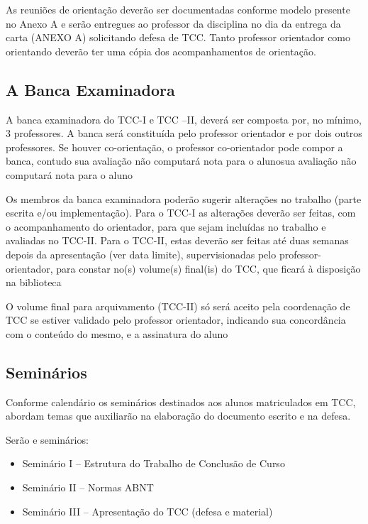 As reuniões de orientação deverão ser documentadas conforme modelo presente no Anexo A e serão entregues ao professor da disciplina no dia da entrega da carta (ANEXO A) solicitando defesa de TCC.
Tanto professor orientador como orientando deverão ter uma cópia dos acompanhamentos de orientação.
	

\subsection{A Banca Examinadora}

A banca examinadora do TCC-I e TCC –II, deverá ser composta por, no mínimo, 3 professores. A banca será constituída pelo 
professor orientador e por dois outros professores. Se houver co-orientação, o professor co-orientador pode compor a banca, contudo sua avaliação não computará nota para o alunosua avaliação não computará nota para o aluno 

Os membros da banca examinadora poderão sugerir alterações no trabalho (parte escrita e/ou implementação). Para o TCC-I as alterações deverão ser feitas, com o acompanhamento do orientador, para que sejam incluídas no trabalho e avaliadas no TCC-II. Para o TCC-II, estas deverão ser feitas até duas semanas depois da apresentação (ver data limite), supervisionadas pelo professor-orientador, para constar no(s) volume(s) final(is) do TCC, que ficará à disposição na biblioteca

O volume final para arquivamento (TCC-II) só será aceito pela coordenação de TCC se estiver validado pelo professor orientador, indicando sua concordância com o conteúdo do mesmo, e a assinatura do aluno


\subsection{Seminários}
Conforme calendário os seminários destinados aos alunos matriculados em TCC, abordam temas que auxiliarão na elaboração do documento escrito e na defesa.

Serão e seminários:
	\begin{itemize}
		\item Seminário I – Estrutura do Trabalho de Conclusão de Curso

		\item Seminário II – Normas ABNT

		\item Seminário III – Apresentação do TCC (defesa e material)
	\end{itemize}

